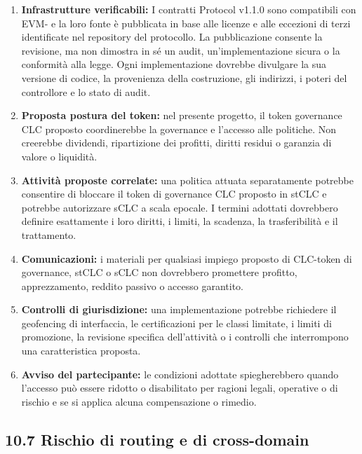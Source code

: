 \documentclass[11pt]{article}
\begin{document}
\begin{enumerate}[leftmargin=*]
\item \textbf{Infrastrutture verificabili:} I contratti Protocol v1.1.0 sono compatibili con EVM- e la loro fonte è pubblicata in base alle licenze e alle eccezioni di terzi identificate nel repository del protocollo. La pubblicazione consente la revisione, ma non dimostra in sé un audit, un'implementazione sicura o la conformità alla legge. Ogni implementazione dovrebbe divulgare la sua versione di codice, la provenienza della costruzione, gli indirizzi, i poteri del controllore e lo stato di audit.
\item \textbf{Proposta postura del token:} nel presente progetto, il token governance CLC proposto coordinerebbe la governance e l'accesso alle politiche. Non creerebbe dividendi, ripartizione dei profitti, diritti residui o garanzia di valore o liquidità.
\item \textbf{Attività proposte correlate:} una politica attuata separatamente potrebbe consentire di bloccare il token di governance CLC proposto in stCLC e potrebbe autorizzare sCLC a scala epocale. I termini adottati dovrebbero definire esattamente i loro diritti, i limiti, la scadenza, la trasferibilità e il trattamento.
\item \textbf{Comunicazioni:} i materiali per qualsiasi impiego proposto di CLC-token di governance, stCLC o sCLC non dovrebbero promettere profitto, apprezzamento, reddito passivo o accesso garantito.
\item \textbf{Controlli di giurisdizione:} una implementazione potrebbe richiedere il geofencing di interfaccia, le certificazioni per le classi limitate, i limiti di promozione, la revisione specifica dell'attività o i controlli che interrompono una caratteristica proposta.
\item \textbf{Avviso del partecipante:} le condizioni adottate spiegherebbero quando l'accesso può essere ridotto o disabilitato per ragioni legali, operative o di rischio e se si applica alcuna compensazione o rimedio.
\end{enumerate}
\subsection*{10.7 Rischio di routing e di cross-domain}
\end{document}
